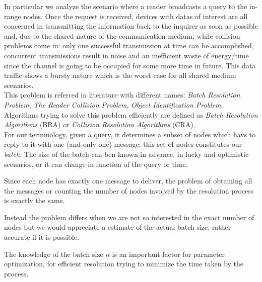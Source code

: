\documentclass[12pt,a4paper]{report}
\begin{document}
In particular we analyze the scenario where a reader broadcasts a query to the in-range nodes. Once the request is received, devices with datas of interest are all concerned in transmitting the information back to the inquirer as soon as possible and, due to the shared nature of the communication medium,  while collision problems come in: only one successful transmission at time can be accomplished, concurrent transmissions result in noise and an inefficient waste of energy/time since the channel is going to be occupied for some more time in future. This data traffic shows a bursty nature which is the worst case for all shared medium scenarios.\\

This problem is referred in literature with different names: \emph{Batch Resolution Problem}, \emph{The Reader Collision Problem}, \emph{Object Identification Problem}.\\
Algorithms trying to solve this problem efficiently  are defined as \emph{Batch Resolution Algorithms} (BRA) or  \emph{Collision Resolution Algorithms} (CRA).\\ 

For our terminology, given a query, it determines a subset of nodes which havs to reply to it with one (and only one) message: this set of nodes constitutes our \emph{batch}. The size of the batch can ben known in advance, in lucky and optimistic scenarios, or it can change in function of the query or time.

Since each node has exactly one message to deliver, the problem of obtaining all the messages or counting the number of nodes involved by the resolution process is exactly the same.

Instead the problem differs when we are not so interested in the exact number of nodes but we would appreciate a estimate of the actual batch size, rather accurate if it is possible.

The knowledge of the batch size $n$ is an important factor for parameter optimization, for efficient resolution trying to minimize the time taken by the process.
\end{document}
